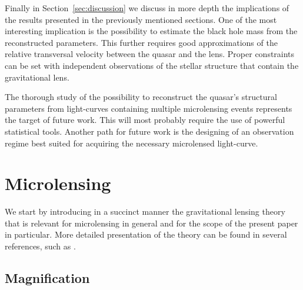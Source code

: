 \documentclass[usenatbib]{mn2e}
\begin{document}
Finally in Section~\ref{sec:discussion} we discuss in more depth the
implications of the results presented in the previously mentioned
sections.  One of the most interesting implication is the possibility
to estimate the black hole mass from the reconstructed
parameters. This further requires good approximations of the relative
transversal velocity between the quasar and the lens. Proper
constraints can be set with independent observations of the stellar
structure that contain the gravitational lens.

The thorough study of the possibility to reconstruct the quasar's
structural parameters from light-curves containing multiple
microlensing events represents the target of future work. This will
most probably require the use of powerful statistical tools. Another
path for future work is the designing of an observation regime best
suited for acquiring the necessary microlensed light-curve.
\section{Microlensing}\label{sec:microlensing}

We start by introducing in a succinct manner the gravitational lensing
theory that is relevant for microlensing in general and for the scope
of the present paper in particular.  More detailed presentation of the
theory can be found in several references, such as
\cite{2001stgl.book.....P}.

\subsection{Magnification}
\end{document}
